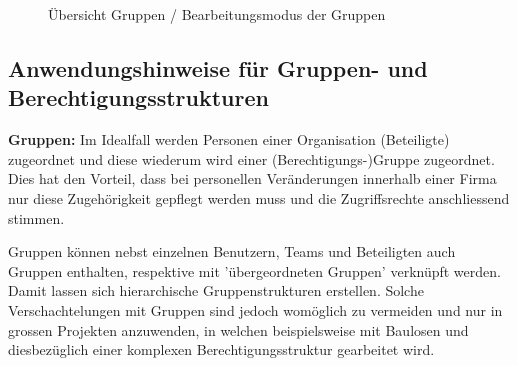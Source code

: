 \begin{figure}[H]
  \vspace{-5pt}
\end{figure}

\begin{figure}[H]
  \vspace{-20pt}
\caption{Übersicht Gruppen / Bearbeitungsmodus der Gruppen}
\end{figure}

\subsection{Anwendungshinweise für Gruppen- und Berechtigungsstrukturen}

\textbf{Gruppen:} Im Idealfall werden Personen einer Organisation (Beteiligte) zugeordnet und diese wiederum wird einer (Berechtigungs-)Gruppe zugeordnet. Dies hat den Vorteil, dass bei personellen Veränderungen innerhalb einer Firma nur diese Zugehörigkeit gepflegt werden muss und die Zugriffsrechte anschliessend stimmen.

\vspace{\baselineskip}

Gruppen können nebst einzelnen Benutzern, Teams und Beteiligten auch Gruppen enthalten, respektive mit 'übergeordneten Gruppen' verknüpft werden. Damit lassen sich hierarchische Gruppenstrukturen erstellen. Solche Verschachtelungen mit Gruppen sind jedoch womöglich zu vermeiden und nur in grossen Projekten anzuwenden, in welchen beispielsweise mit Baulosen und diesbezüglich einer komplexen Berechtigungsstruktur gearbeitet wird.


